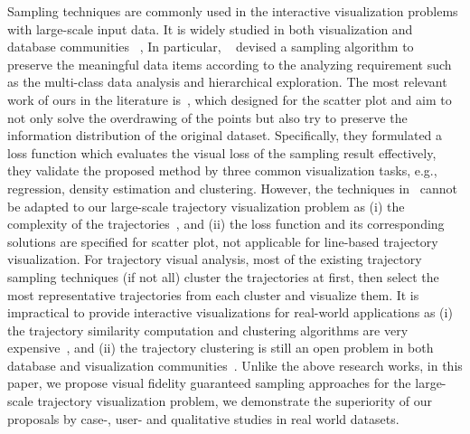 Sampling techniques are commonly used in the interactive visualization problems with large-scale input data.
It is widely studied in both visualization and database communities ~\cite{battle2013dynamic,chen2014visual,park2016visualization},
In particular, ~\cite{chen2014visual} devised a sampling algorithm to preserve the meaningful data items according to the analyzing requirement such as the multi-class data analysis and hierarchical exploration.
The most relevant work of ours in the literature is~\cite{park2016visualization}, which designed for the scatter plot and aim to not only solve the overdrawing of the points but also try to preserve the information distribution of the original dataset.
Specifically, they formulated a loss function which evaluates the visual loss of the sampling result effectively,
they validate the proposed method by three common visualization tasks, e.g., regression, density estimation and clustering.
However, the techniques in~\cite{park2016visualization} cannot be adapted to our large-scale trajectory visualization problem
as (i) the complexity of the trajectories~\cite{pelekis2010unsupervised}, and (ii) the loss function and its corresponding solutions are specified for scatter plot, not applicable for line-based trajectory visualization.
For trajectory visual analysis,  most of the existing trajectory sampling techniques (if not all) cluster the trajectories at first,
then select the most representative trajectories from each cluster and visualize them.
It is impractical to provide interactive visualizations for real-world applications as
(i) the trajectory similarity computation and clustering algorithms are very expensive~\cite{pelekis2007similarity},
and (ii) the trajectory clustering is still an open problem in both database and visualization communities~\cite{panagiotakis2011segmentation,agarwal2018subtrajectory}.
Unlike the above research works, in this paper, we propose visual fidelity guaranteed sampling approaches for the large-scale trajectory visualization problem,
we demonstrate the superiority of our proposals by case-, user- and qualitative studies in real world datasets.






